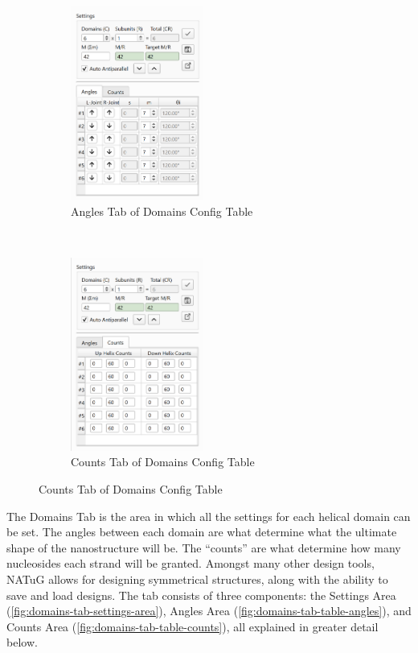\documentclass[titlepage]{article}
\begin{document}
\begin{figure}[h] \label{fig:domain-config-table-angles}
	\centering
	\caption{Domains Config Table}
	
	\begin{subfigure}{.45\linewidth} \label{fig:domains-config-table-angles-tab}
		\centering
		\includegraphics[height=2.5in]{domain-config-table-angles.png}
		\caption{Angles Tab of Domains Config Table}
	\end{subfigure}%
	~
	\begin{subfigure}{.45\linewidth} \label{fig:domains-config-table-counts-tab}
		\centering
		\includegraphics[height=2.5in]{domain-config-table-counts.png}
		\caption{Counts Tab of Domains Config Table}
	\end{subfigure}
\end{figure}

The Domains Tab is the area in which all the settings for each helical domain can be set. The angles between each domain are what determine what the ultimate shape of the nanostructure will be. The ``counts'' are what determine how many nucleosides each strand will be granted. Amongst many other design tools, NATuG allows for designing symmetrical structures, along with the ability to save and load designs. The tab consists of three components: the Settings Area (\ref{fig:domains-tab-settings-area}), Angles Area (\ref{fig:domains-tab-table-angles}), and Counts Area (\ref{fig:domains-tab-table-counts}), all explained in greater detail below.
\end{document}
